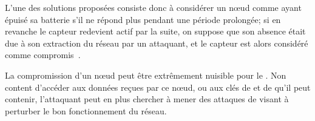 L'une des solutions proposées consiste donc à considérer un nœud comme ayant épuisé sa batterie s'il ne répond plus pendant une période prolongée; si en revanche le capteur redevient actif par la suite, on suppose que son absence était due à son extraction du réseau par un attaquant, et le capteur est alors considéré comme compromis~\cite{Ho10}.

La compromission d'un nœud peut être extrêmement nuisible pour le \rc.
Non content d'accéder aux données reçues par ce nœud, ou aux clés de  et de  qu'il peut contenir, l'attaquant peut en plus chercher à mener des attaques de \dds visant à perturber le bon fonctionnement du réseau.
